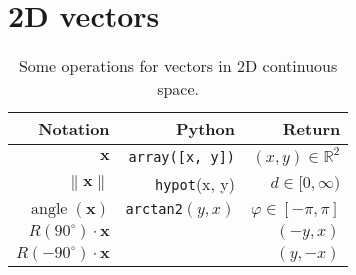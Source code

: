 \section{2D vectors}
\begin{table}[H]
\begin{tabularx}{1.0\linewidth}{ R R R }
Notation & Python & Return \\
\hline
\hline
$ \mathbf{x} $ & \texttt{array([x, y])} & $ (x, y) \in \mathbb{R}^{2} $ \\
$ \left\| \mathbf{x} \right\| $      & \texttt{hypot}(x, y) & $ d \in [0, \infty) $ \\
$ \operatorname{angle}(\mathbf{x}) $ & \texttt{arctan2}$ (y, x) $ & $ \varphi \in [-\pi, \pi] $ \\
$ R(90^{\circ}) \cdot \mathbf{x} $   &  & $ (-y, x) $ \\
$ R(-90^{\circ}) \cdot \mathbf{x} $  &  & $ (y, -x) $ \\
\end{tabularx}
\caption{Some operations for vectors in 2D continuous space.}
\end{table}